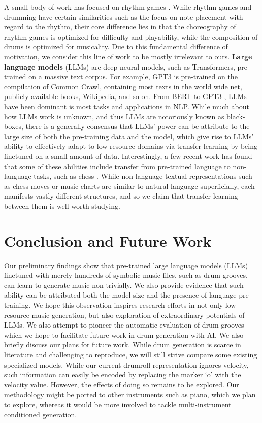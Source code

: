 \documentclass[letterpaper]{article} %
\begin{document}
A small body of work has focused on rhythm games \cite{donahue2017dance,liang2019procedural}. While rhythm games and drumming have certain similarities such as the focus on note placement with regard to the rhythm, their core difference lies in that the choreography of rhythm games is optimized for difficulty and playability, while the composition of drums is optimized for musicality. Due to this fundamental difference of motivation, we consider this line of work to be mostly irrelevant to ours.  \textbf{Large language models} (LLMs) are deep neural models, such as Transformers, pre-trained on a massive text corpus. For example, GPT3 is pre-trained on the compilation of Common Crawl, containing most texts in the world wide net, publicly available books, Wikipedia, and so on. From BERT \cite{devlin-etal-2019-bert} to GPT3 \cite{NEURIPS2020_1457c0d6}, LLMs have been dominant is most tasks and applications in NLP. While much about how LLMs work is unknown, and thus LLMs are notoriously known as black-boxes, there is a generally consensus that LLMs' power can be attribute to the large size of both the pre-training data and the model, which give rise to LLMs' ability to effectively adapt to low-resource domains via transfer learning by being finetuned on a small amount of data. Interestingly, a few recent work has found that some of these abilities include transfer from pre-trained language to non-language tasks, such as chess \cite{stockl-2021-watching}. While non-language textual representations such as chess moves or music charts are similar to natural language superficially, each manifests vastly different structures, and so we claim that transfer learning between them is well worth studying.

\vspace{-0.75mm}
\section{Conclusion and Future Work}
Our preliminary findings show that pre-trained large language models (LLMs) finetuned with merely hundreds of symbolic music files, such as drum grooves, can learn to generate music non-trivially. We also provide evidence that such ability can be attributed both the model size and the presence of language pre-training. We hope this observation inspires research efforts in not only low-resource music generation, but also exploration of extraordinary potentials of LLMs. We also attempt to pioneer the automatic evaluation of drum grooves which we hope to facilitate future work in drum generation with AI.  We also briefly discuss our plans for future work. While drum generation is scarce in literature and challenging to reproduce, we will still strive compare some existing specialized models. While our current drumroll representation ignores velocity, such information can easily be encoded by replacing the marker `o' with the velocity value. However, the effects of doing so remains to be explored. Our methodology might be ported to other instruments such as piano, which we plan to explore, whereas it would be more involved to tackle multi-instrument conditioned generation.
\end{document}
